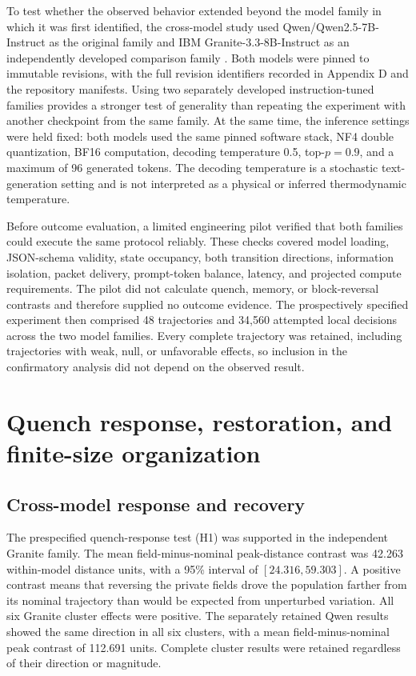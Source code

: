 \documentclass[12pt]{article}
\begin{document}
To test whether the observed behavior extended beyond the model family in
which it was first identified, the cross-model study used
Qwen/Qwen2.5-7B-Instruct as the original family and
IBM Granite-3.3-8B-Instruct as an independently developed comparison family
\cite{qwen2024,granite33model}. Both models were pinned to immutable revisions,
with the full revision identifiers recorded in Appendix D and the repository
manifests. Using two separately developed instruction-tuned families provides a
stronger test of generality than repeating the experiment with another
checkpoint from the same family. At the same time, the inference settings were
held fixed: both models used the same pinned software stack, NF4 double
quantization, BF16 computation, decoding temperature 0.5, top-$p=0.9$, and a
maximum of 96 generated tokens. The decoding temperature is a stochastic
text-generation setting and is not interpreted as a physical or inferred
thermodynamic temperature.

Before outcome evaluation, a limited engineering pilot verified that both
families could execute the same protocol reliably. These checks covered model
loading, JSON-schema validity, state occupancy, both transition directions,
information isolation, packet delivery, prompt-token balance, latency, and
projected compute requirements. The pilot did not calculate quench, memory, or
block-reversal contrasts and therefore supplied no outcome evidence. The
prospectively specified experiment then comprised 48 trajectories and 34,560
attempted local decisions across the two model families. Every complete
trajectory was retained, including trajectories with weak, null, or
unfavorable effects, so inclusion in the confirmatory analysis did not depend
on the observed result.






\section{Quench response, restoration, and finite-size organization}
\label{sec:quench-results}

\subsection{Cross-model response and recovery}
\label{sec:field-response}

The prespecified quench-response test (H1) was supported in the independent
Granite family. The mean field-minus-nominal peak-distance contrast was
42.263 within-model distance units, with a 95\% interval of
$[24.316,59.303]$. A positive contrast means that reversing the private fields
drove the population farther from its nominal trajectory than would be
expected from unperturbed variation. All six Granite cluster effects were
positive. The separately retained Qwen results showed the same direction in
all six clusters, with a mean field-minus-nominal peak contrast of 112.691
units. Complete cluster results were retained regardless of their direction or
magnitude.
\end{document}
